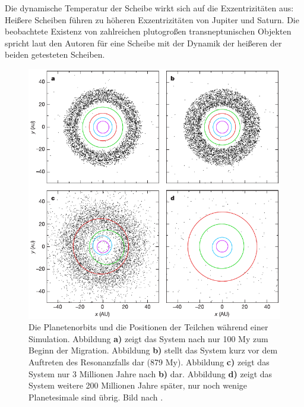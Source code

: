 \documentclass[12pt,a4paper,twoside]{article}
\begin{document}
Die dynamische Temperatur der Scheibe wirkt sich auf die Exzentrizitäten aus: Heißere Scheiben führen zu höheren Exzentrizitäten von Jupiter und Saturn. Die beobachtete Existenz von zahlreichen plutogroßen transneptunischen Objekten spricht laut den Autoren für eine Scheibe mit der Dynamik der heißeren der beiden getesteten Scheiben\cite{Tsiganis2005}. %



\begin{figure}[tbn]
\centering
\includegraphics[scale=1]{img/Gomes2005-2.pdf}
\caption{Die Planetenorbits und die Positionen der Teilchen während einer Simulation. Abbildung \textbf{a)} zeigt das System nach nur 100 My zum Beginn der Migration. Abbildung \textbf{b)} stellt das System kurz vor dem Auftreten des Resonanzfalls dar (879 My). Abbildung \textbf{c)} zeigt das System nur 3 Millionen Jahre nach \textbf{b)} dar. Abbildung \textbf{d)} zeigt das System weitere 200 Millionen Jahre später, nur noch wenige Planetesimale sind übrig. Bild nach \cite{Gomes2005}.} %
\label{fig:Zeitlicheentwicklung}
\end{figure}
\end{document}
